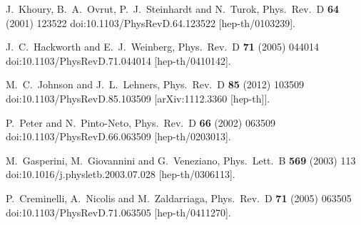 \documentclass{article}
\begin{document}
\begin{thebibliography}{99}
J.~Khoury, B.~A.~Ovrut, P.~J.~Steinhardt and N.~Turok,
Phys.\ Rev.\ D {\bf 64} (2001) 123522
doi:10.1103/PhysRevD.64.123522
[hep-th/0103239].










J.~C.~Hackworth and E.~J.~Weinberg,
Phys.\ Rev.\ D {\bf 71} (2005) 044014
doi:10.1103/PhysRevD.71.044014
[hep-th/0410142].




M.~C.~Johnson and J.~L.~Lehners,
Phys.\ Rev.\ D {\bf 85} (2012) 103509
doi:10.1103/PhysRevD.85.103509
[arXiv:1112.3360 [hep-th]].



P.~Peter and N.~Pinto-Neto,
Phys.\ Rev.\ D {\bf 66} (2002) 063509
doi:10.1103/PhysRevD.66.063509
[hep-th/0203013].


M.~Gasperini, M.~Giovannini and G.~Veneziano,
Phys.\ Lett.\ B {\bf 569} (2003) 113
doi:10.1016/j.physletb.2003.07.028
[hep-th/0306113].



P.~Creminelli, A.~Nicolis and M.~Zaldarriaga,
Phys.\ Rev.\ D {\bf 71} (2005) 063505
doi:10.1103/PhysRevD.71.063505
[hep-th/0411270].



\end{thebibliography}
\end{document}
